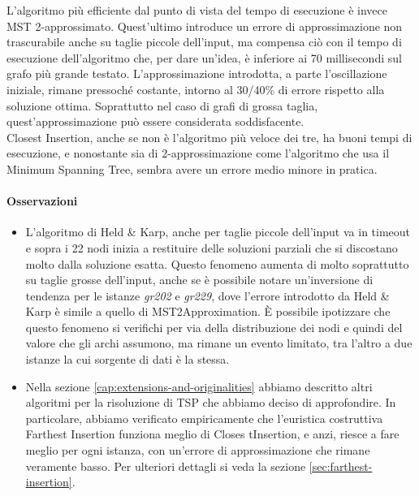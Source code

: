 \noindent L'algoritmo più efficiente dal punto di vista del tempo di
esecuzione è invece MST 2-approssimato.  Quest'ultimo introduce un
errore di approssimazione non trascurabile anche su taglie piccole
dell'input, ma compensa ciò con il tempo di esecuzione dell'algoritmo
che, per dare un'idea, è inferiore ai 70 millisecondi sul grafo più
grande testato. L'approssimazione introdotta, a parte l'oscillazione
iniziale, rimane pressoché costante, intorno al 30/40\% di errore
rispetto alla soluzione ottima. Soprattutto nel caso di grafi di grossa taglia, quest'approssimazione può essere considerata soddisfacente. \\

\noindent Closest Insertion, anche se non è l'algoritmo più veloce
dei tre, ha buoni tempi di esecuzione, e nonostante sia di 2-approssimazione come l'algoritmo che usa il Minimum Spanning Tree, sembra avere un errore medio minore in pratica.

\paragraph{Osservazioni}

\begin{itemize}
    \item L'algoritmo di Held \& Karp, anche per taglie piccole dell'input
      va in timeout e sopra i 22 nodi inizia a restituire delle
      soluzioni parziali che si discostano molto dalla soluzione
      esatta. Questo fenomeno aumenta di molto soprattutto su taglie
      grosse dell'input, anche se è possibile notare un'inversione di
      tendenza per le istanze \emph{gr202} e \emph{gr229}, dove
      l'errore introdotto da Held \& Karp è simile a quello di
      MST2Approximation. È possibile ipotizzare che questo fenomeno
      si verifichi per via della distribuzione dei nodi e quindi del
      valore che gli archi assumono, ma rimane un evento limitato, tra
      l'altro a due istanze la cui sorgente di dati è la stessa. \\

    \item Nella sezione \ref{cap:extensions-and-originalities} abbiamo
      descritto altri algoritmi per la risoluzione di TSP che abbiamo
      deciso di approfondire. In particolare, abbiamo verificato
      empiricamente che l'euristica costruttiva Farthest Insertion
      funziona meglio di Closes tInsertion, e anzi, riesce a fare
      meglio per ogni istanza, con un'errore di approssimazione che
      rimane veramente basso. Per ulteriori dettagli si veda la
      sezione \ref{sec:farthest-insertion}. \\
\end{itemize}

